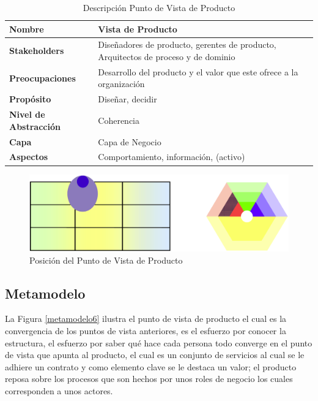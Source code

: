       \begin{table}[h]
      	\centering
      	\begin{tabular}{p{3.7cm}p{8cm}}
      		\hline
      		\textbf{Nombre} & \textbf{Vista de Producto} \\
      		\hline
      		\textbf{Stakeholders} & Diseñadores de producto, gerentes de producto, Arquitectos de proceso y de dominio \\
      		\textbf{Preocupaciones} & Desarrollo del producto y el valor que este ofrece a la organización \\
      		\textbf{Propósito} & Diseñar, decidir \\
      		\textbf{Nivel de Abstracción} & Coherencia \\
      		\textbf{Capa} & Capa de Negocio \\
      		\textbf{Aspectos} & Comportamiento, información, (activo) \\
      	\end{tabular}
      	\caption{Descripción Punto de Vista de Producto}
      	\label{tabla9}
      \end{table}

      \begin{figure}[h]
      	\centering
      	\includegraphics[scale=0.2]{Imagenes/Figuras/19.png}
      	\caption{Posición del Punto de Vista de Producto}
      	\label{figura19}
      \end{figure}

      \subsection{Metamodelo}
      La Figura \ref{metamodelo6} ilustra el punto de vista de producto el cual es la convergencia de los puntos de vista anteriores, es el esfuerzo por conocer la estructura, el esfuerzo por saber qué hace cada persona todo converge en el punto de vista que apunta al producto, el cual es un conjunto de servicios al cual se le adhiere un contrato y como elemento clave se le destaca un valor; el producto reposa sobre los procesos que son hechos por unos roles de negocio los cuales corresponden a unos actores. \cite{ref9}

